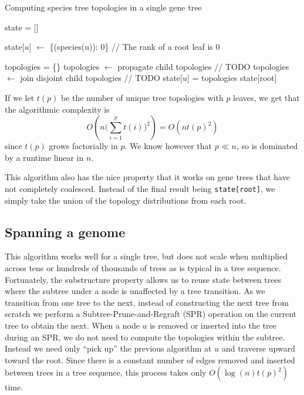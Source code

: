 \documentclass{article}
\begin{document}
\begin{algorithm}
    \caption{Computing species tree topologies in a single gene tree}
    \label{alg:dp_alg}
    \begin{algorithmic}
        \State state = []

        \State state[$u$] $\leftarrow$ \{(species(u)): 0\} // The rank of a root leaf is 0
        \EndFor

            \State topologies = \{\}
            \State topologies $\leftarrow$ propagate child topologies // TODO
            \State topologies $\leftarrow$ join disjoint child topologies // TODO
            \State state[$u$] = topologies
        \EndFor
        \State \Return state[root]
    \end{algorithmic}
\end{algorithm}
If we let $t(p)$ be the number of unique tree topologies with $p$ leaves,
we get that the algorithmic complexity is
\[
    O(n \big(\sum_{i=1}^p t(i)\big)^2) = O(n t(p)^2)
\]
since $t(p)$ grows factorially in $p$. We know however that $p \ll n$, so is
dominated by a runtime linear in $n$.

This algorithm also has the nice property that it works on gene trees
that have not completely coalesced. Instead of the final result being
\texttt{state[root]}, we simply take the union of the topology distributions
from each root.

\subsection{Spanning a genome}
This algorithm works well for a single tree, but does not scale when multiplied
across tens or hundreds of thousands of trees as is typical in a tree sequence.
Fortunately, the substructure property allows us to reuse state between trees
where the subtree under a node is unaffected by a tree transition.
As we transition from one tree to the next, instead of constructing
the next tree from scratch we perform a Subtree-Prune-and-Regraft (SPR) operation
on the current tree to obtain the next.
When a node $u$ is removed or inserted into the tree during an SPR, we do not
need to compute the topologies within the subtree.
Instead we need only ``pick up'' the previous algorithm at $u$ and traverse
upward toward the root.
Since there is a constant number of edges removed and inserted between trees
in a tree sequence, this process takes only $O(\log(n)t(p)^2)$ time.
\end{document}

